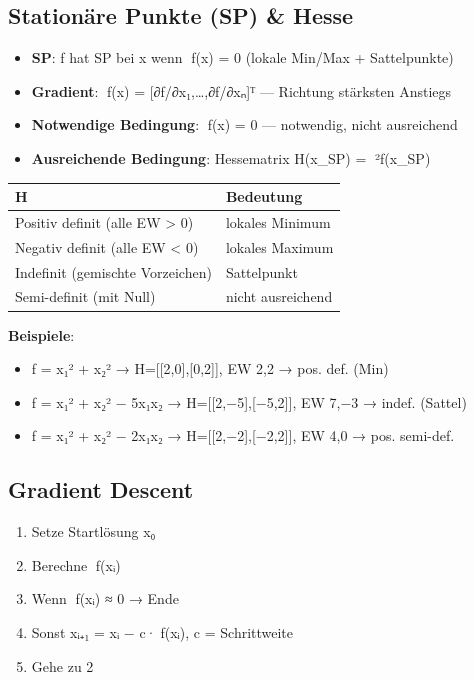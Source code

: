 \documentclass[11pt, a4paper]{article}
\begin{document}
\subsection{Stationäre Punkte (SP) \& Hesse}

\begin{itemize}
  \item \textbf{SP}: f hat SP bei x⃗ wenn ∇f(x⃗) = 0⃗ (lokale Min/Max + Sattelpunkte)
  \item \textbf{Gradient}: ∇f(x⃗) = [∂f/∂x₁,…,∂f/∂xₙ]ᵀ — Richtung stärksten Anstiegs
  \item \textbf{Notwendige Bedingung}: ∇f(x⃗) = 0⃗ — notwendig, nicht ausreichend
  \item \textbf{Ausreichende Bedingung}: Hessematrix H(x⃗\_SP) = ∇²f(x⃗\_SP)
\end{itemize}


{\small
\begin{tabularx}{\linewidth}{XX}
\hline
\rowcolor{tableheadbg}
{\color{white}\textbf{H}} & {\color{white}\textbf{Bedeutung}} \\[2pt]
\hline
\endhead
\hline
\endfoot
Positiv definit (alle EW > 0) & lokales Minimum \\
Negativ definit (alle EW < 0) & lokales Maximum \\
Indefinit (gemischte Vorzeichen) & Sattelpunkt \\
Semi-definit (mit Null) & nicht ausreichend \\
\end{tabularx}
}


\textbf{Beispiele}:

\begin{itemize}
  \item f = x₁² + x₂² → H=[[2,0],[0,2]], EW 2,2 → pos. def. (Min)
  \item f = x₁² + x₂² − 5x₁x₂ → H=[[2,−5],[−5,2]], EW 7,−3 → indef. (Sattel)
  \item f = x₁² + x₂² − 2x₁x₂ → H=[[2,−2],[−2,2]], EW 4,0 → pos. semi-def.
\end{itemize}


\subsection{Gradient Descent}

\begin{enumerate}
  \item Setze Startlösung x⃗₀
  \item Berechne ∇f(x⃗ᵢ)
  \item Wenn ∇f(x⃗ᵢ) ≈ 0⃗ → Ende
  \item Sonst x⃗ᵢ₊₁ = x⃗ᵢ − c·∇f(x⃗ᵢ), c = Schrittweite
  \item Gehe zu 2
\end{enumerate}
\end{document}
